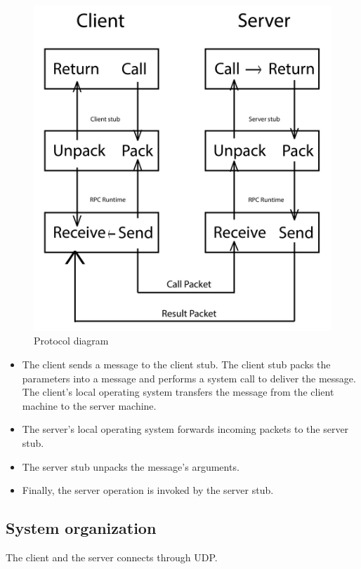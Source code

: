\documentclass[13pt]{article}
\begin{document}
\begin{figure}[h]
    \centering
    \includegraphics[scale=0.2]{protocol_diagram-01.png}
    \caption{Protocol diagram}
    \label{fig:protocol}
\end{figure}

\begin{itemize}
    \item The client sends a message to the client stub. The client stub packs the parameters into a message and performs a system call to deliver the message. The client's local operating system transfers the message from the client machine to the server machine.
    \item The server's local operating system forwards incoming packets to the server stub.
    \item The server stub unpacks the message's arguments.
    \item Finally, the server operation is invoked by the server stub.
\end{itemize}

\subsection{System organization}
\noindent%
The client and the server connects through UDP.
\end{document}
